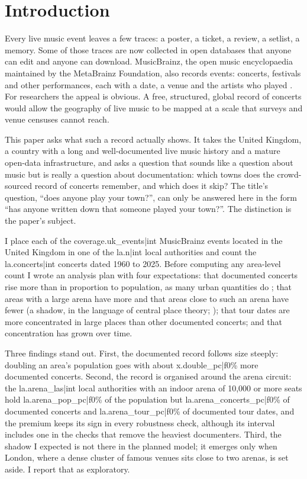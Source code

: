 \documentclass[11pt,a4paper]{article}
\begin{document}
\section{Introduction}\label{sec:intro}
Every live music event leaves a few traces: a poster, a ticket, a review, a setlist, a memory. Some of those traces are now collected in open databases that anyone can edit and anyone can download. MusicBrainz, the open music encyclopaedia maintained by the MetaBrainz Foundation, also records events: concerts, festivals and other performances, each with a date, a venue and the artists who played \citep{metabrainz2026}. For researchers the appeal is obvious. A free, structured, global record of concerts would allow the geography of live music to be mapped at a scale that surveys and venue censuses cannot reach.

This paper asks what such a record actually shows. It takes the United Kingdom, a country with a long and well-documented live music history \citep{frith2013,frith2021} and a mature open-data infrastructure, and asks a question that sounds like a question about music but is really a question about documentation: which towns does the crowd-sourced record of concerts remember, and which does it skip? The title's question, ``does anyone play your town?'', can only be answered here in the form ``has anyone written down that someone played your town?''. The distinction is the paper's subject.

I place each of the {{coverage.uk_events|int}} MusicBrainz events located in the United Kingdom in one of the {{la.n|int}} local authorities and count the {{la.concerts|int}} concerts dated 1960 to 2025. Before computing any area-level count I wrote an analysis plan with four expectations: that documented concerts rise more than in proportion to population, as many urban quantities do \citep{bettencourt2007}; that areas with a large arena have more and that areas close to such an arena have fewer (a shadow, in the language of central place theory; \citealp{christaller1966}); that tour dates are more concentrated in large places than other documented concerts; and that concentration has grown over time.

Three findings stand out. First, the documented record follows size steeply: doubling an area's population goes with about {{x.double_pc|f0}}\% more documented concerts. Second, the record is organised around the arena circuit: the {{la.arena_las|int}} local authorities with an indoor arena of 10,000 or more seats hold {{la.arena_pop_pc|f0}}\% of the population but {{la.arena_concerts_pc|f0}}\% of documented concerts and {{la.arena_tour_pc|f0}}\% of documented tour dates, and the premium keeps its sign in every robustness check, although its interval includes one in the checks that remove the heaviest documenters. Third, the shadow I expected is not there in the planned model; it emerges only when London, where a dense cluster of famous venues sits close to two arenas, is set aside. I report that as exploratory.
\end{document}
